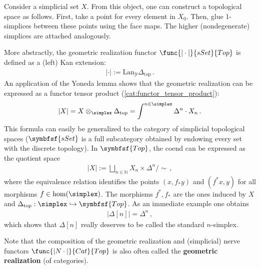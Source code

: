     \begin{example}\label{model:geometric_realization}
        Consider a simplicial set $X$. From this object, one can construct a topological space as follows. First, take a point for every element in $X_0$. Then, glue 1-simplices between these points using the face maps. The higher (nondegenerate) simplices are attached analogously.

        More abstractly, the geometric realization functor $\func{|\cdot|}{sSet}{Top}$ is defined as a (left) Kan extension:
        \begin{gather}
            |\cdot| := \mathrm{Lan}_{\mathcal{Y}}\Delta_\mathrm{top}\,.
        \end{gather}
        An application of the Yoneda lemma shows that the geometric realization can be expressed as a functor tensor product (\cref{cat:functor_tensor_product}):
        \begin{gather}
            |X| = X\otimes_{\simplex}\Delta_\mathrm{top}=\int^{n\in\simplex}\Delta^n\cdot X_n\,.
        \end{gather}
        This formula can easily be generalized to the category of simplicial topological spaces ($\symbfsf{sSet}$ is a full subcategory obtained by endowing every set with the discrete topology). In $\symbfsf{Top}$, the coend can be expressed as the quotient space
        \begin{gather}
            |X| := \bigsqcup_{n\in\mathbb{N}}X_n\times\Delta^n/\sim\,,
        \end{gather}
        where the equivalence relation identifies the points $(x,f_*y)$ and $(f^*x,y)$ for all morphisms $f\in\mathrm{hom}(\simplex)$. The morphisms $f^*,f_*$ are the ones induced by $X$ and $\Delta_\mathrm{top}:\simplex\hookrightarrow\symbfsf{Top}$. As an immediate example one obtains
        \begin{gather}
            |\Delta[n]| = \Delta^n\,,
        \end{gather}
        which shows that $\Delta[n]$ really deserves to be called the standard $n$-simplex.
    \end{example}
    \begin{remark}\label{model:geometric_realization_categories}
        Note that the composition of the geometric realization and (simplicial) nerve functors $\func{|N\cdot|}{Cat}{Top}$ is also often called the \textbf{geometric realization} (of categories).
    \end{remark}

